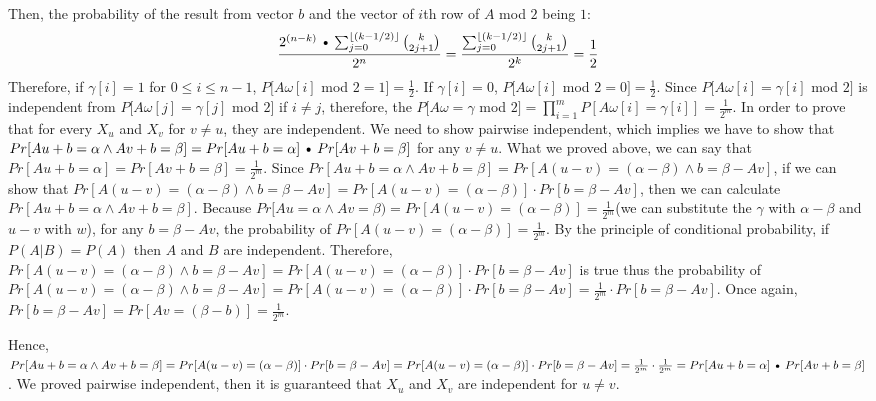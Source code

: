 \documentclass[11pt]{article}%
\begin{document}
\begin{questions}[1]
\begin{enumerate}[(a)]
    Then, the probability of the result from vector $b$ and the vector of $i$th row of $A$ mod $2$ being $1$:
    $$\frac {2^{(n-k)}\Cdot\sum_{j=0}^{\floor{(k-1/2)}}{k\choose 2j+1 }}{2^n} = \frac {\sum_{j=0}^{\floor{(k-1/2)}}{k\choose 2j+1 }}{2^k} = \frac{1}{2}$$
    Therefore, if $\gamma[i] = 1$ for $0\leq i \leq n-1$, $P[A\omega[i]$ mod $2 = 1] = \frac{1}{2}$. If $\gamma[i] = 0$, $P[A\omega[i]$ mod $2 = 0] = \frac{1}{2}$. Since $P[A\omega[i] = \gamma[i]$ mod $2]$ is independent from $P[A\omega[j] = \gamma[j]$ mod $2]$ if $i \neq j$, therefore, the $P[A\omega = \gamma $ mod $2] = \prod_{i=1}^m P[A\omega[i] = \gamma[i]] = \frac{1}{2^m}$. 
    \newline
    \newline
    In order to prove that for every $X_u$ and $X_v$ for $v \neq u$, they are independent. We need to show pairwise independent, which implies we have to show that $Pr[Au+b = \alpha \wedge Av+b = \beta ] = Pr[Au+b = \alpha]\Cdot Pr[ Av+b = \beta ]$ for any $v \neq u$. 
    \newline
    \newline
    What we proved above, we can say that $Pr[Au+b = \alpha] = Pr[ Av+b = \beta ] = \frac{1}{2^m}$. Since $Pr[Au+b = \alpha \wedge Av+b = \beta] = Pr[A(u-v) = (\alpha-\beta) \wedge b = \beta-Av]$, if we can show that $Pr[A(u-v) = (\alpha-\beta) \wedge b = \beta-Av] = Pr[A(u-v) = (\alpha-\beta)] \cdot Pr[b = \beta-Av]$, then we can calculate $Pr[Au+b = \alpha \wedge Av+b = \beta]$.
    \newline
    \newline
    Because $Pr[Au = \alpha \wedge Av = \beta) = Pr[A(u-v) = (\alpha-\beta)] = \frac{1}{2^m}$(we can substitute the $\gamma$ with $\alpha-\beta$ and $u-v$ with $w$), for any $b = \beta-Av$, the probability of $Pr[A(u-v) = (\alpha-\beta)] = \frac{1}{2^m}$. By the principle of conditional probability, if $P(A | B) = P(A)$ then $A$ and $B$ are independent. Therefore, $Pr[A(u-v) = (\alpha-\beta) \wedge b = \beta-Av] = Pr[A(u-v) = (\alpha-\beta)] \cdot Pr[b = \beta-Av]$ is true thus the probability of $Pr[A(u-v) = (\alpha-\beta) \wedge b = \beta-Av] = Pr[A(u-v) = (\alpha-\beta)] \cdot Pr[b = \beta-Av] = \frac{1}{2^m} \cdot Pr[b = \beta-Av]$. Once again, 
    $Pr[b = \beta-Av] = Pr[Av = (\beta-b)] = \frac{1}{2^m}$.
    \newline
    
    Hence, $Pr[Au+b = \alpha \wedge Av+b = \beta] = Pr[A(u-v) = (\alpha-\beta)] \cdot Pr[b = \beta-Av] = Pr[A(u-v) = (\alpha-\beta)] \cdot Pr[b = \beta-Av] = \frac{1}{2^m} \cdot \frac{1}{2^m} = Pr[Au+b = \alpha]\Cdot Pr[ Av+b = \beta ]$. We proved pairwise independent, then it is guaranteed that $X_u$ and $X_v$ are independent for $u \neq v$. 
    

\end{enumerate}
\end{questions}
\end{document}
